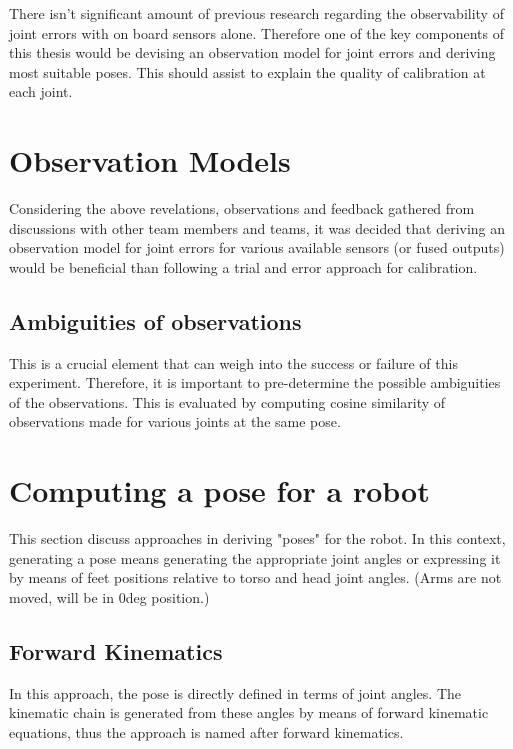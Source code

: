 \documentclass[english, printversion, nomenclature, notitle]{tuvisionthesis} %
\begin{document}
There isn't significant amount of previous research regarding the observability of joint errors with on board sensors alone. Therefore one of the key components of this thesis would be devising an observation model for joint errors and deriving most suitable poses. This should assist to explain the quality of calibration at each joint.

\section{Observation Models}
Considering the above revelations, observations and feedback gathered from discussions with other team members and teams, it was decided that deriving an observation model for joint errors for various available sensors (or fused outputs) would be beneficial than following a trial and error approach for calibration.

\subsection{Ambiguities of observations}
This is a crucial element that can weigh into the success or failure of this experiment. Therefore, it is important to pre-determine the possible ambiguities of the observations. This is evaluated by computing cosine similarity of observations made for various joints at the same pose. 

\section{Computing a pose for a robot}
This section discuss approaches in deriving "poses" for the robot. In this context, generating a pose means generating the appropriate joint angles or expressing it by means of feet positions relative to torso and head joint angles. (Arms are not moved, will be in 0deg position.)

\subsection{Forward Kinematics}

In this approach, the pose is directly defined in terms of joint angles. The kinematic chain is generated from these angles by means of forward kinematic equations, thus the approach is named after forward kinematics.
\end{document}
